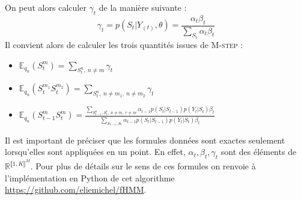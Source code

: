 \documentclass[10pt,a4paper]{article}
\newcommand{\Mstep}{\textsc{M-step}}
\begin{document}
On peut alors calculer $\gamma_t$ de la manière suivante :
\begin{equation}
\gamma_t=p(S_t \vert Y_{(t)}, \theta)= \frac{\alpha_t 
\beta_t}{\underset{S_t}{\sum} \alpha_t \beta_t}
\end{equation}
Il convient alors de calculer les trois quantités issues de \Mstep{} :
\begin{itemize}
\item $\mathbb{E}_{q_n}(S_t^m)= \underset{S_t^n, \ n \neq m}{\sum} \gamma_t$
\item $\mathbb{E}_{q_n}(S_t^{m_1}S_t^{m_2})= \underset{S_t^n, \ n \neq m_1, \ n 
\neq m_2}{\sum} \gamma_t$
\item $\mathbb{E}_{q_n}(S_{t-1}^mS_t^m)= \frac{\underset{S_{t-1}^n,S_t^r, \ n 
\neq m, \ r \neq m}{\sum}\alpha_{t-1} p(S_t \vert S_{t-1}) p(Y_t \vert S_t) 
\beta_t}{\underset{S_{t-1}, S_t}{\sum}\alpha_{t-1}p(S_t \vert S_{t-1})p(Y_t 
\vert S_t) \beta_t} $
\end{itemize}
Il est important de préciser que les formules données sont exactes seulement 
lorsqu'elles sont appliquées en un point. En effet, $\alpha_t, \beta_t, 
\gamma_t$ sont des éléments de $\mathbb{R}^{\llbracket 1,K \rrbracket^M}$. Pour 
plus de détails sur le sens de ces formules on renvoie à l'implémentation en 
Python de cet algorithme \href{url}{https://github.com/eliemichel/fHMM}.
\end{document}

